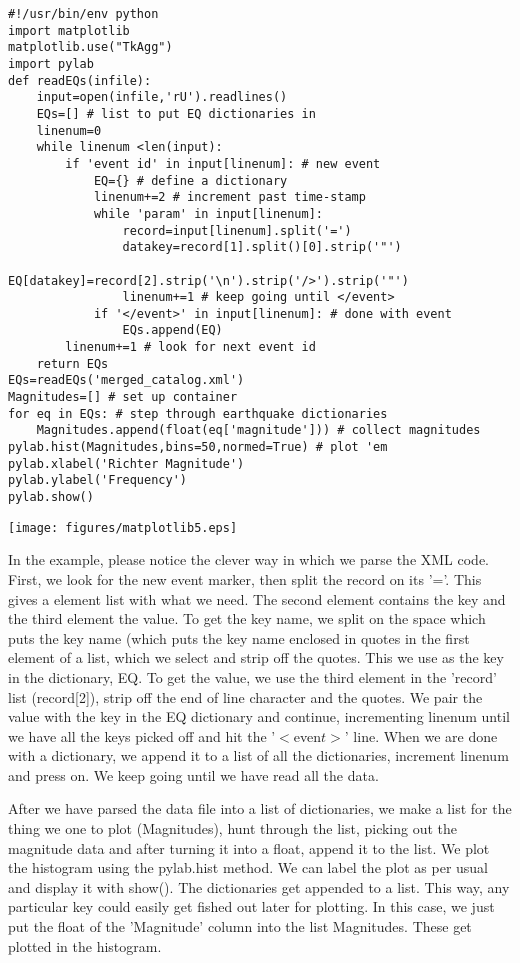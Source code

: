 {{{{\singlespacing \color{blue} \begin{verbatim}
#!/usr/bin/env python
import matplotlib
matplotlib.use("TkAgg")
import pylab
def readEQs(infile):
    input=open(infile,'rU').readlines()
    EQs=[] # list to put EQ dictionaries in
    linenum=0
    while linenum <len(input):
        if 'event id' in input[linenum]: # new event
            EQ={} # define a dictionary
            linenum+=2 # increment past time-stamp
            while 'param' in input[linenum]:
                record=input[linenum].split('=')
                datakey=record[1].split()[0].strip('"')
                EQ[datakey]=record[2].strip('\n').strip('/>').strip('"')
                linenum+=1 # keep going until </event>
            if '</event>' in input[linenum]: # done with event
                EQs.append(EQ)
        linenum+=1 # look for next event id
    return EQs
EQs=readEQs('merged_catalog.xml')
Magnitudes=[] # set up container
for eq in EQs: # step through earthquake dictionaries
    Magnitudes.append(float(eq['magnitude'])) # collect magnitudes
pylab.hist(Magnitudes,bins=50,normed=True) # plot 'em
pylab.xlabel('Richter Magnitude')
pylab.ylabel('Frequency')
pylab.show()  
\end{verbatim}}

\texttt{[image: figures/matplotlib5.eps]}

\noindent
In the example, please notice the clever way in which we parse the XML code.  First, we look for the new event marker, then split the record on its '='.  This gives a element list with what we need.  The second element contains the key and the third element the value.  To get the key name, we split on the space which puts the key name (which puts the key name enclosed in quotes in the first element of a list, which we select and strip off the quotes.  This we use as the key in the dictionary, EQ.  To get the value, we use the third element in the 'record' list (record[2]), strip off the end of line character and the quotes.  We pair the value with the key in the EQ dictionary and continue, incrementing linenum until we have all the keys picked off and hit the '$<$even$t>$' line.  When we are done with a dictionary, we append it to a list of all the dictionaries, increment linenum and press on.  We keep going until we have read all the data.  

After we have parsed the data file into a list of dictionaries, we make a list for the thing we one to plot (Magnitudes), hunt through the list, picking out the magnitude data and after turning it into a float, append it to the list.  We plot the histogram using the {\color{blue}pylab.hist} method.  We can label the plot as per usual and display it with {\color{blue}show()}.     The dictionaries get appended to a list.  This way, any particular key could easily get fished out later for plotting.  In this case, we just put the float of the 'Magnitude' column into the list Magnitudes.  These get plotted in the histogram.  
}}}
